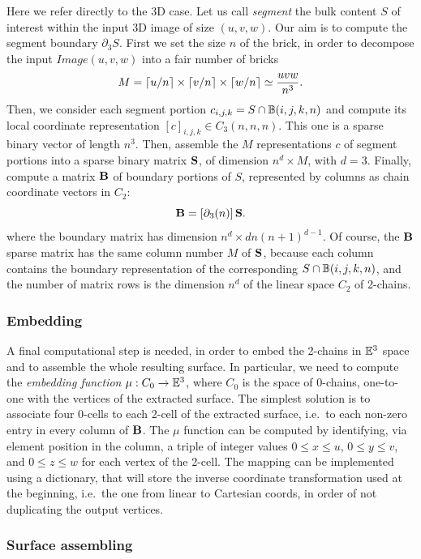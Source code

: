 Here we refer directly to the 3D case.
Let us call \emph{segment} the bulk content $S$ of interest within the input 3D image of size $(u,v,w)$. Our aim is to compute the segment boundary $\partial_3 S$. 
First we set the size $n$ of the brick, in order to decompose the input $Image(u,v,w)$ into a fair number of bricks
\[
M = \left\lceil u/n \right\rceil \times \left\lceil v/n \right\rceil \times \left\lceil w/n \right\rceil \simeq \frac{uvw}{n^3}.
\] 
Then, we consider each segment portion $c_{i,j,k} = S\cap \mathbb{B}(i,j,k,n)$ and compute its local coordinate representation  $[c]_{i,j,k}\in C_3(n,n,n)$. This one is a sparse binary vector of length $n^3$. Then, assemble the $M$ representations $c$ of segment portions into a sparse binary matrix ${\bf S}$, of dimension $n^d \times M$, with $d=3$. Finally, compute a matrix ${\bf \textbf{B}}$ of boundary portions of $S$, represented by columns as chain coordinate vectors in $C_2$:
\[
{\bf \textbf{B}} = [\partial_3(n)]\, {\bf S}.
\]
where the boundary matrix has dimension $n^d \times dn(n+1)^{d-1}$.
Of course, the ${\bf \textbf{B}}$ sparse matrix has the same column number $M$ of ${\bf S}$, because each column contains the boundary representation of the corresponding $S \cap \mathbb{B}(i,j,k,n)$, and the number of matrix rows is the dimension $n^d$ of the linear space $C_2$ of 2-chains.

\subsubsection*{Embedding}
A final computational step is needed, in order to embed the 2-chains in $\mathbb{E}^3$ space and to assemble the whole resulting surface. In particular, we need to compute the \emph{embedding function} $\mu : C_0 \to \mathbb{E}^3$, where $C_0$ is the space of 0-chains, one-to-one with the vertices of the extracted surface. The simplest solution is to associate  four 0-cells to each 2-cell of the extracted surface, i.e.~to each non-zero entry in every column of ${\bf \textbf{B}}$.  The $\mu$ function  can be computed by identifying, via  element position in the column, a triple of integer values $0\leq x\leq u$, $0\leq y\leq v$, and $0\leq z\leq w$ for each vertex of the 2-cell.  The mapping can be implemented using a dictionary, that will store the inverse coordinate transformation used at the beginning, i.e.~the one from linear to Cartesian coords, in order of not duplicating the output vertices.   

\subsubsection*{Surface assembling}

